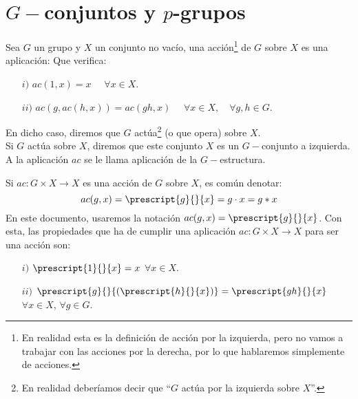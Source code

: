 \chapter{$G-$conjuntos y $p$-grupos}
\begin{definicion}
    Sea $G$ un grupo y $X$ un conjunto no vacío, una acción\footnote{En realidad esta es la definición de acción por la izquierda, pero no vamos a trabajar con las acciones por la derecha, por lo que hablaremos simplemente de acciones.} de $G$ sobre $X$ es una aplicación: 
    Que verifica:
    \begin{enumerate}
        \item[$i)$] $ac(1,x) = x$ $\quad \forall x\in X$.
        \item[$ii)$] $ac(g, ac(h, x)) = ac(gh, x)$ $\quad \forall x\in X, \quad \forall g,h\in G$.
    \end{enumerate}
    En dicho caso, diremos que $G$ actúa\footnote{En realidad deberíamos decir que ``$G$ actúa por la izquierda sobre $X$''.} (o que opera) sobre $X$.\\

    \noindent
    Si $G$ actúa sobre $X$, diremos que este conjunto $X$ es un $G-$conjunto a izquierda. A la aplicación $ac$ se le llama aplicación de la $G-$estructura.
\end{definicion}

\begin{notacion}
    Si $ac:G\times X\to X$ es una acción de $G$ sobre $X$, es común denotar:
    \begin{equation*}
        ac(g,x) = \prescript{g}{}{x} = g\cdot x = g\ast x
    \end{equation*}
    En este documento, usaremos la notación $ac(g,x) = \prescript{g}{}{x}$. Con esta, las propiedades que ha de cumplir una aplicación $ac:G\times X\to X$ para ser una acción son:
    \begin{enumerate}
        \item[$i)$] $\prescript{1}{}{x} = x$ $\forall x\in X$.
        \item[$ii)$] $\prescript{g}{}{(\prescript{h}{}{x})} = \prescript{gh}{}{x}$ $\forall x\in X$, $\forall g\in G$.
    \end{enumerate}
\end{notacion}

